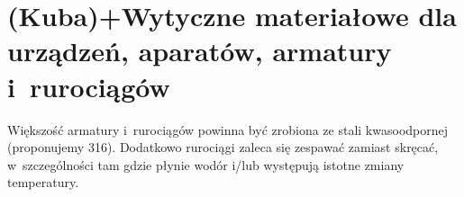 \section{(Kuba)+Wytyczne materiałowe dla urządzeń, aparatów, armatury i~rurociągów}

Większość armatury i~rurociągów powinna być zrobiona ze stali kwasoodpornej
(proponujemy 316). Dodatkowo rurociągi zaleca się zespawać zamiast
skręcać, w~szczególności tam gdzie płynie wodór i/lub występują istotne
zmiany temperatury.
